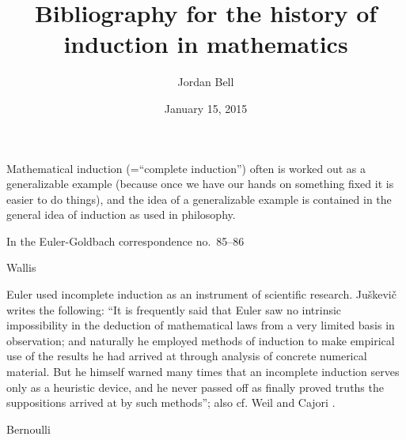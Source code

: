 \documentclass{article}
\begin{document}
\title{Bibliography for the history of induction in mathematics}
\author{Jordan Bell}
\date{January 15, 2015}


\maketitle

Mathematical induction (=``complete induction'') often is worked out as a generalizable example (because once we have our hands on something fixed it is easier to do things),
and the idea of a generalizable example is contained in the general idea of induction as used in philosophy.

In the Euler-Goldbach correspondence no.~85--86

Wallis \cite[p.~474]{wallisIV}

Euler used incomplete induction as
an instrument of scientific research.
Ju{\v s}kevi{\v c} \cite{eulerdsb} writes
the following:
``It is frequently said that Euler saw no intrinsic impossibility in
the deduction of mathematical laws from a very limited basis in
observation; and naturally he employed methods of induction to
make empirical use of the results he had arrived at through analysis
of concrete numerical material. But he himself warned many times that an
incomplete induction serves only as a heuristic device, and he never
passed off as finally proved truths the suppositions arrived at by
such methods''; also cf. Weil \cite[Chapter II, \S III]{weil}
and
Cajori \cite{cajori}.

Bernoulli \cite[p.~29]{bernoulli2}

\nocite{*}



\end{document}
